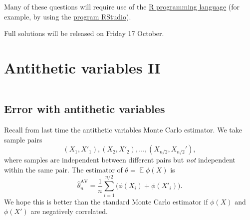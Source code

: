 \documentclass[
  letterpaper,
  DIV=11,
  numbers=noendperiod]{scrreprt}
\newcommand{\Exg}{\operatorname{\mathbb{E}}}
\theoremstyle{plain}
\theoremstyle{definition}
\theoremstyle{definition}
\theoremstyle{remark}
\begin{document}
Many of these questions will require use of the
\href{https://cran.r-project.org}{R programming language} (for example,
by using the \href{https://posit.co/downloads/}{program RStudio}).

Full solutions will be released on Friday 17 October.

\chapter{Antithetic variables II}\label{antithetic-variables-ii}

\[ \]

\section{Error with antithetic
variables}\label{error-with-antithetic-variables}

Recall from last time the antithetic variables Monte Carlo estimator. We
take sample pairs
\[ (X_1, X'_1), (X_2, X'_2), \dots, (X_{n/2}, X_{n/2}') , \] where
samples are independent between different pairs but \emph{not}
independent within the same pair. The estimator of
\(\theta = \Exg \phi(X)\) is
\[ \widehat{\theta}_n^{\mathrm{AV}} = \frac{1}{n} \sum_{i=1}^{n/2} \big(\phi(X_i) + \phi(X'_i) \big) .\]
We hope this is better than the standard Monte Carlo estimator if
\(\phi(X)\) and \(\phi(X')\) are negatively correlated.
\end{document}
